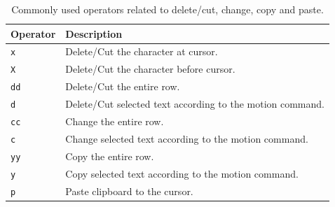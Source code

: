 \begin{table}[!htb]
  \centering \caption{Commonly used operators related to delete/cut, change, copy and paste.}\label{ch:tfe:tab:deletecut}
  \begin{tabularx}{\textwidth}{lX}
    \hline
    Operator & Description \\ \hline
    \verb|x| & Delete/Cut the character at cursor. \\ 
    \verb|X| & Delete/Cut the character before cursor. \\ 
    \verb|dd| & Delete/Cut the entire row. \\ 
    \verb|d| & Delete/Cut selected text according to the motion command. \\ 
    \verb|cc| & Change the entire row. \\ 
    \verb|c| & Change selected text according to the motion command. \\ 
    \verb|yy| & Copy the entire row. \\ 
    \verb|y| & Copy selected text according to the motion command. \\ 
    \verb|p| & Paste clipboard to the cursor. \\
    \hline
  \end{tabularx}
\end{table}

